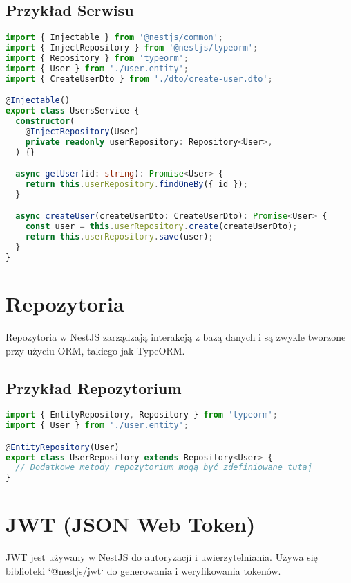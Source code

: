 \documentclass[a4paper,12pt]{article}
\begin{document}
\subsection{Przykład Serwisu}
\begin{lstlisting}[language=TypeScript, caption=Przykład serwisu w NestJS]
import { Injectable } from '@nestjs/common';
import { InjectRepository } from '@nestjs/typeorm';
import { Repository } from 'typeorm';
import { User } from './user.entity';
import { CreateUserDto } from './dto/create-user.dto';

@Injectable()
export class UsersService {
  constructor(
    @InjectRepository(User)
    private readonly userRepository: Repository<User>,
  ) {}

  async getUser(id: string): Promise<User> {
    return this.userRepository.findOneBy({ id });
  }

  async createUser(createUserDto: CreateUserDto): Promise<User> {
    const user = this.userRepository.create(createUserDto);
    return this.userRepository.save(user);
  }
}
\end{lstlisting}

\section{Repozytoria}
Repozytoria w NestJS zarządzają interakcją z bazą danych i są zwykle tworzone przy użyciu ORM, takiego jak TypeORM.

\subsection{Przykład Repozytorium}
\begin{lstlisting}[language=TypeScript, caption=Przykład repozytorium w NestJS]
import { EntityRepository, Repository } from 'typeorm';
import { User } from './user.entity';

@EntityRepository(User)
export class UserRepository extends Repository<User> {
  // Dodatkowe metody repozytorium mogą być zdefiniowane tutaj
}
\end{lstlisting}

\section{JWT (JSON Web Token)}
JWT jest używany w NestJS do autoryzacji i uwierzytelniania. Używa się biblioteki `@nestjs/jwt` do generowania i weryfikowania tokenów.
\end{document}

